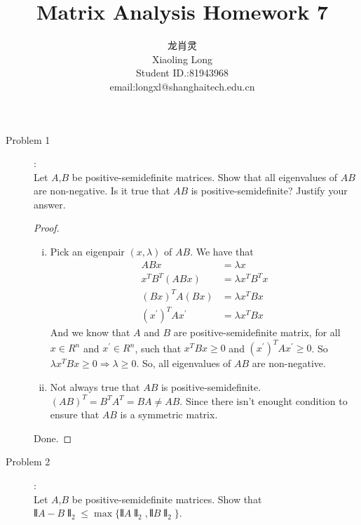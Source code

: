 \documentclass[a4paper]{article}
\title{Matrix Analysis Homework 7}
\author{龙肖灵 \\Xiaoling Long\\Student ID.:81943968\\email:longxl@shanghaitech.edu.cn}
\begin{document}
\maketitle

\begin{description}
  \item[Problem 1]:\\
  Let $A$,$B$ be positive-semidefinite matrices. Show that all eigenvalues of $AB$ are non-negative.
   Is it true that $AB$ is positive-semidefinite? Justify your answer.

  \begin{proof}\
    \begin{enumerate}[i)]
      \item
      Pick an eigenpair $(x,\lambda)$ of $AB$. We have that
      \begin{align*}
        ABx&=\lambda x\\
        x^{T}B^{T}(ABx)&=\lambda x^{T}B^{T}x\\
        (Bx)^{T}A(Bx)&=\lambda x^{T}Bx\\
        (x^{\prime})^{T}Ax^{\prime}&=\lambda x^{T}Bx
      \end{align*}
      And we know that $A$ and $B$ are positive-semidefinite matrix, for all $x\in R^{n}$ and $x^{\prime}\in R^{n}$, such that $x^{T}Bx\ge 0$ and $(x^{\prime})^{T}Ax^{\prime}\ge 0$. So $\lambda x^{T}Bx \ge 0\Rightarrow \lambda\ge 0$.
      So, all eigenvalues of $AB$ are non-negative.
      \item Not always true that $AB$ is positive-semidefinite. $(AB)^{T}=B^{T}A^{T}=BA\ne AB$. Since there isn't enought condition to ensure that $AB$ is a symmetric matrix.
    \end{enumerate}
    Done.
  \end{proof}

  \item[Problem 2]:\\
   Let $A$,$B$ be positive-semidefinite matrices. Show that $\interleave A-B\interleave _{2}\le \max\{\interleave A\interleave_{2},\interleave B\interleave_{2}\}$.


\end{description}
\end{document}
